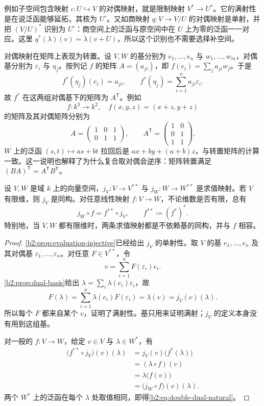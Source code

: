 例如子空间包含映射 \(\iota:U\hookrightarrow V\) 的对偶映射，就是限制映射 \(V^*\to U^*\)。它的满射性是在说泛函能够延拓，其核为 \(U^\circ\)。又如商映射 \(q:V\to V/U\) 的对偶映射是单射，并把 \((V/U)^*\) 识别为 \(U^\circ\)：商空间上的泛函与原空间中在 \(U\) 上为零的泛函一一对应。这里 \(q^*(\lambda)(v)=\lambda(v+U)\)，所以这个识别也不需要选择补空间。

\ProseParagraphBreak
对偶映射在矩阵上表现为转置。设 \(V,W\) 的基分别为 \(e_1,\ldots,e_n\) 与 \(w_1,\ldots,w_m\)，对偶基分别为 \(\varepsilon_i\) 与 \(\eta_j\)。按列记 \(f\) 的矩阵 \(A=(a_{ji})\)，即 \(f(e_i)=\sum_j a_{ji}w_j\)。于是
\[
	f^*(\eta_j)(e_i)=a_{ji},\qquad f^*(\eta_j)=\sum_{i=1}^n a_{ji}\varepsilon_i.
\]
故 \(f^*\) 在这两组对偶基下的矩阵为 \(A^{\mathsf T}\)。例如
\[
	f:k^3\longrightarrow k^2,\quad f(x,y,z)=(x+z,y+z)
\]
的矩阵及其对偶矩阵分别为
\[
	A=\begin{pmatrix}1&0&1\\0&1&1\end{pmatrix},\qquad
	A^{\mathsf T}=\begin{pmatrix}1&0\\0&1\\1&1\end{pmatrix}.
\]
\(W\) 上的泛函 \((s,t)\mapsto as+bt\) 拉回后是 \(ax+by+(a+b)z\)，与转置矩阵的计算一致。这一说明也解释了为什么复合取对偶会逆序：矩阵转置满足 \((BA)^{\mathsf T}=A^{\mathsf T}B^{\mathsf T}\)。

\begin{theorem}[有限维双对偶同构]\label{b2:thm:double-dual}
	设 \(V,W\) 是域 \(k\) 上的向量空间，\(j_V:V\to V^{**}\) 与 \(j_W:W\to W^{**}\) 是求值映射。若 \(V\) 有限维，则 \(j_V\) 是同构。对任意线性映射 \(f:V\to W\)，不论维数是否有限，总有
	\begin{equation}\label{b2:eq:double-dual-natural}
		j_W\circ f=f^{**}\circ j_V, \qquad f^{**}\coloneqq(f^*)^*.
	\end{equation}
	特别地，当 \(V,W\) 都有限维时，两条求值映射都是不依赖基的同构，并与 \(f\) 相容。
\end{theorem}

\begin{proof}
	\cref{b2:prop:evaluation-injective}已经给出 \(j_V\) 的单射性。取 \(V\) 的基 \(e_1,\ldots,e_n\) 及其对偶基 \(\varepsilon_1,\ldots,\varepsilon_n\)。对任意 \(F\in V^{**}\)，令
	\[
		v=\sum_{i=1}^n F(\varepsilon_i)e_i.
	\]
	\cref{b2:prop:dual-basis}给出 \(\lambda=\sum_i\lambda(e_i)\varepsilon_i\)，故
	\[
		F(\lambda)=\sum_{i=1}^n\lambda(e_i)F(\varepsilon_i)=\lambda(v)=j_V(v)(\lambda).
	\]
	所以每个 \(F\) 都来自某个 \(v\)，证明了满射性。基只用来证明满射；\(j_V\) 的定义本身没有用到这组基。

	对一般的 \(f:V\to W\)，给定 \(v\in V\) 与 \(\lambda\in W^*\)，有
	\[
		\begin{aligned}
			\bigl(f^{**}\circ j_V\bigr)(v)(\lambda) &=j_V(v)\bigl(f^*(\lambda)\bigr)\\
			&=(\lambda\circ f)(v)\\
			&=\lambda\bigl(f(v)\bigr)\\
			&=\bigl(j_W\circ f\bigr)(v)(\lambda).
		\end{aligned}
	\]
	两个 \(W^*\) 上的泛函在每个 \(\lambda\) 处取值相同，即得\eqref{b2:eq:double-dual-natural}。
\end{proof}

